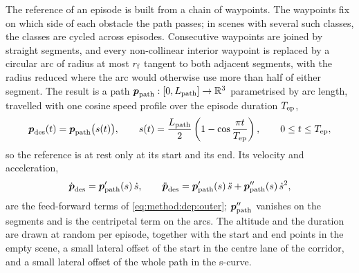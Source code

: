 The reference of an episode is built from a chain of waypoints. The waypoints fix on which side of each
obstacle the path passes; in scenes with several such classes, the classes are cycled across episodes.
Consecutive waypoints are joined by straight segments, and every non-collinear interior waypoint is
replaced by a circular arc of radius at most $r_{\textrm{f}}$ tangent to both adjacent segments, with the
radius reduced where the arc would otherwise use more than half of either segment. The result is a
path $\boldsymbol{p}_{\textrm{path}}:[0,L_{\textrm{path}}]\to\mathbb{R}^{3}$ parametrised by arc length, travelled with one cosine
speed profile over the episode duration $T_{\textrm{ep}}$,
\begin{equation}\label{eq:method:env:uavref}
  \boldsymbol{p}_{\textrm{des}}(t) = \boldsymbol{p}_{\textrm{path}}\big(s(t)\big),
  \qquad
  s(t) = \frac{L_{\textrm{path}}}{2}\left(1-\cos\frac{\pi t}{T_{\textrm{ep}}}\right),
  \qquad 0\le t\le T_{\textrm{ep}},
\end{equation}
so the reference is at rest only at its start and its end. Its velocity and acceleration,
\begin{equation}\label{eq:method:env:uavrefderiv}
  \dot{\boldsymbol{p}}_{\textrm{des}} = \boldsymbol{p}_{\textrm{path}}'(s)\,\dot{s},
  \qquad
  \ddot{\boldsymbol{p}}_{\textrm{des}} = \boldsymbol{p}_{\textrm{path}}'(s)\,\ddot{s} + \boldsymbol{p}_{\textrm{path}}''(s)\,\dot{s}^{2},
\end{equation}
are the feed-forward terms of \eqref{eq:method:dep:outer}; $\boldsymbol{p}_{\textrm{path}}''$ vanishes on the segments
and is the centripetal term on the arcs. The altitude and the duration are drawn at random per
episode, together with the start and end points in the empty scene, a small lateral offset of the start
in the centre lane of the corridor, and a small lateral offset of the whole path in the s-curve.

